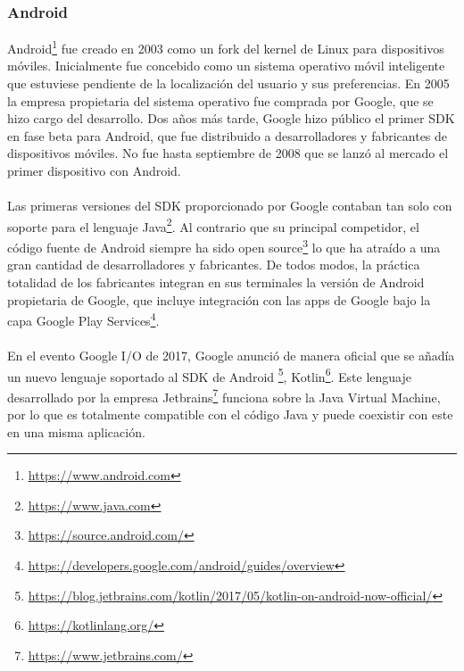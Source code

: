 \documentclass[a4paper, 12pt]{article}
\begin{document}
\subsubsection{Android}
\label{sec-2-1-2}
Android\footnote{\url{https://www.android.com}} fue creado en 2003 como un fork del kernel de Linux para dispositivos
móviles. Inicialmente fue concebido como un sistema operativo móvil inteligente que
estuviese pendiente de la localización del usuario y sus preferencias. En 2005 la
empresa propietaria del sistema operativo fue comprada por Google, que se hizo cargo
del desarrollo. Dos años más tarde, Google hizo público el primer SDK en fase beta
para Android, que fue distribuido a desarrolladores y fabricantes de dispositivos
móviles. No fue hasta septiembre de 2008 que se lanzó al mercado el primer dispositivo
con Android.
\\
\\
Las primeras versiones del SDK proporcionado por Google contaban tan solo con
soporte para el lenguaje Java\footnote{\url{https://www.java.com}}. Al contrario que su principal competidor, el código fuente
de Android siempre ha sido open source\footnote{\url{https://source.android.com/}} lo que ha atraído a una gran cantidad de
desarrolladores y fabricantes. De todos modos, la práctica totalidad de los fabricantes
integran en sus terminales la versión de Android propietaria de Google, que incluye
integración con las apps de Google bajo la capa Google Play Services\footnote{\url{https://developers.google.com/android/guides/overview}}.
\\
\\
En el evento Google I/O de 2017, Google anunció de manera oficial que se añadía un
nuevo lenguaje soportado al SDK de Android \footnote{\url{https://blog.jetbrains.com/kotlin/2017/05/kotlin-on-android-now-official/}}, Kotlin\footnote{\url{https://kotlinlang.org/}}. Este lenguaje desarrollado
por la empresa Jetbrains\footnote{\url{https://www.jetbrains.com/}} funciona sobre la Java Virtual Machine, por lo que es totalmente compatible con el código Java y puede
coexistir con este en una misma aplicación.
\end{document}

